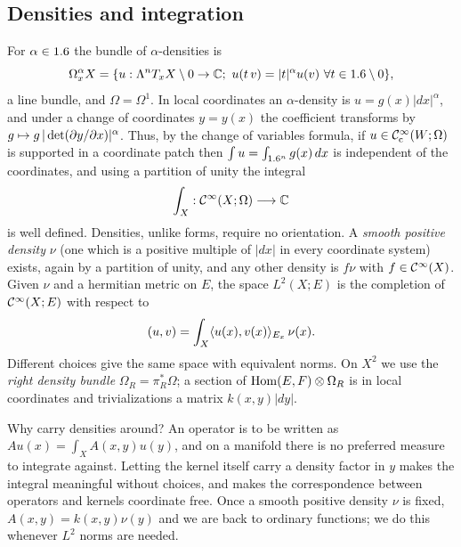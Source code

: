 \subsection{Densities and integration}
For $\alpha\in1.6$ the bundle of $\alpha$-densities is
\begin{equation*}
\Omega^\alpha_xX=\{u:\Lambda^n T_xX\setminus 0\to\mathbb{C};\ u(t\,v)=|t|^\alpha u(v)\ \forall t\in1.6\setminus0\},
\end{equation*}
a line bundle, and $\Omega=\Omega^1$. In local coordinates an $\alpha$-density
is $u=g(x)|dx|^\alpha$, and under a change of coordinates $y=y(x)$ the
coefficient transforms by $g\mapsto g\,|\det(\partial y/\partial x)|^{\alpha}$. Thus, by the
change of variables formula, if $u\in\mathcal{C}^\infty_{\mathrm{c}}(W;\Omega)$ is supported in a coordinate
patch then $\int u=\int_{1.6^n}g(x)\,dx$ is independent of the coordinates, and
using a partition of unity the integral
\begin{equation*}
\int_X:\mathcal{C}^\infty(X;\Omega)\longrightarrow\mathbb{C}
\end{equation*}
is well defined. Densities, unlike forms, require no orientation. A \emph{smooth
positive density} $\nu$ (one which is a positive multiple of $|dx|$ in every
coordinate system) exists, again by a partition of unity, and any other density is
$f\nu$ with $f\in\mathcal{C}^\infty(X)$. Given $\nu$ and a hermitian metric on $E$, the space
$L^2(X;E)$ is the completion of $\mathcal{C}^\infty(X;E)$ with respect to
\begin{equation}\label{manifolds:eq:L2}
( u, v)=\int_X\langle u(x),v(x)\rangle_{E_x}\,\nu(x).
\end{equation}
Different choices give the same space with equivalent norms. On $X^2$ we use the
\emph{right density bundle} $\Omega_R=\pi_R^*\Omega$; a section of
$\operatorname{Hom}(E,F)\otimes\Omega_R$ is in local coordinates and trivializations a matrix
$k(x,y)|dy|$.

\begin{discussion}
Why carry densities around? An operator is to be written as
$Au(x)=\int_XA(x,y)u(y)$, and on a manifold there is no preferred measure
to integrate against. Letting the kernel itself carry a density factor in
$y$ makes the integral meaningful without choices, and makes the
correspondence between operators and kernels coordinate free. Once a smooth
positive density $\nu$ is fixed, $A(x,y)=k(x,y)\nu(y)$ and we are back to
ordinary functions; we do this whenever $L^2$ norms are needed.
\end{discussion}

